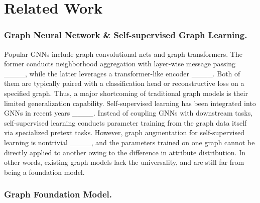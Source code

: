 \section{Related Work}
\vspace{-0.03in}
\subsubsection*{\textbf{Graph Neural Network \& Self-supervised Graph Learning.}}
Popular GNNs include graph convolutional nets and graph transformers.
The former conducts neighborhood aggregation with layer-wise message passing ____, while the latter leverages a transformer-like encoder ____.
Both of them are typically paired with a classification head or reconstructive loss on a specified graph.
Thus, a major shortcoming of traditional graph models is their limited generalization capability.
Self-supervised learning has been integrated into GNNs in recent years ____.
Instead of coupling GNNs with downstream tasks, self-supervised learning conducts parameter training from the graph data itself via specialized pretext tasks. 
However, graph augmentation for self-supervised learning is nontrivial ____, and the parameters trained on one graph cannot be directly applied to another owing to the difference in attribute distribution.
In other words, existing graph models lack the universality, and are still far from being a foundation model.

  \vspace{-0.05in}
\subsubsection*{\textbf{Graph Foundation Model.}}


